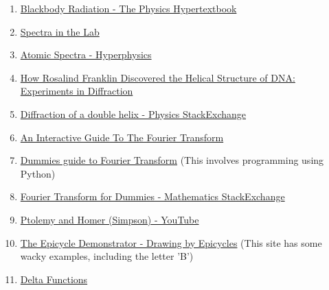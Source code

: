 \begin{enumerate}
\item \href{https://physics.info/planck/}{Blackbody Radiation - The Physics Hypertextbook}
\item \href{https://www.ifa.hawaii.edu/~barnes/ASTR110L_F05/spectralab.html}{Spectra in the Lab}
\item \href{http://hyperphysics.phy-astr.gsu.edu/hbase/quantum/atspect.html}{Atomic Spectra - Hyperphysics}
\item \href{https://pdfs.semanticscholar.org/8ccd/de212e9059a35c111704073aea2443984614.pdf}{How Rosalind Franklin Discovered the Helical Structure of DNA: Experiments in Diffraction}
\item \href{https://physics.stackexchange.com/questions/383138/diffraction-pattern-due-to-double-helix?rq=1}{Diffraction of a double helix - Physics StackExchange}
\item \href{https://betterexplained.com/articles/an-interactive-guide-to-the-fourier-transform/}{An Interactive Guide To The Fourier Transform}
\item \href{https://nipunbatra.github.io/blog/2016/FT.html}{Dummies guide to Fourier Transform} (This involves programming using Python)
\item \href{https://math.stackexchange.com/questions/1002/fourier-transform-for-dummies}{Fourier Transform for Dummies - Mathematics StackExchange}
\item \href{https://www.youtube.com/watch?v=QVuU2YCwHjw}{Ptolemy and Homer (Simpson) - YouTube}
\item \href{http://brettcvz.github.io/epicycles/}{The Epicycle Demonstrator - Drawing by Epicycles} (This site has some wacky examples, including the letter 'B')
\item \href{http://www.cchem.berkeley.edu/chem120a/extra/delta_functions.pdf}{Delta Functions}
\end{enumerate}
